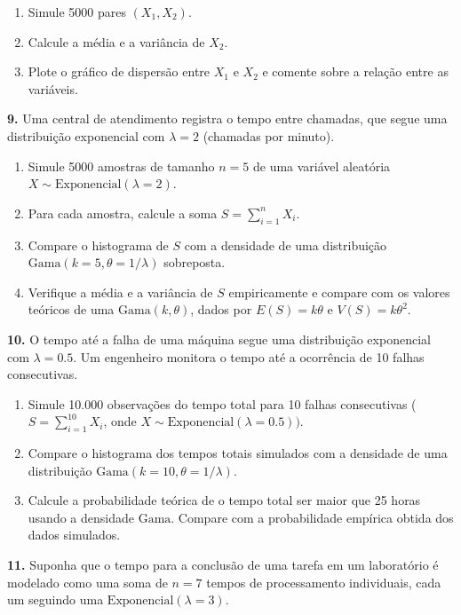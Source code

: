 \documentclass[
]{book}
\begin{document}
\begin{enumerate}
\def\labelenumi{(\alph{enumi})}
\item
  Simule 5000 pares \((X_1, X_2)\).
\item
  Calcule a média e a variância de \(X_2\).
\item
  Plote o gráfico de dispersão entre \(X_1\) e \(X_2\) e comente sobre a relação entre as variáveis.
\end{enumerate}

\textbf{9.} Uma central de atendimento registra o tempo entre chamadas, que segue uma distribuição exponencial com \(\lambda = 2\) (chamadas por minuto).

\begin{enumerate}
\def\labelenumi{(\alph{enumi})}
\item
  Simule 5000 amostras de tamanho \(n = 5\) de uma variável aleatória \(X \sim \text{Exponencial}(\lambda = 2)\).
\item
  Para cada amostra, calcule a soma \(S = \sum_{i=1}^n X_i\).
\item
  Compare o histograma de \(S\) com a densidade de uma distribuição \(\text{Gama}(k = 5, \theta = 1/\lambda)\) sobreposta.
\item
  Verifique a média e a variância de \(S\) empiricamente e compare com os valores teóricos de uma \(\text{Gama}(k, \theta)\), dados por \(E(S) = k\theta\) e \(V(S) = k\theta^2\).
\end{enumerate}

\textbf{10.} O tempo até a falha de uma máquina segue uma distribuição exponencial com \(\lambda = 0.5\). Um engenheiro monitora o tempo até a ocorrência de 10 falhas consecutivas.

\begin{enumerate}
\def\labelenumi{(\alph{enumi})}
\item
  Simule 10.000 observações do tempo total para 10 falhas consecutivas (\(S = \sum_{i=1}^{10} X_i\), onde \(X \sim \text{Exponencial}(\lambda = 0.5))\).
\item
  Compare o histograma dos tempos totais simulados com a densidade de uma distribuição \(\text{Gama}(k = 10, \theta = 1/\lambda)\).
\item
  Calcule a probabilidade teórica de o tempo total ser maior que 25 horas usando a densidade \(\text{Gama}\). Compare com a probabilidade empírica obtida dos dados simulados.
\end{enumerate}

\textbf{11.} Suponha que o tempo para a conclusão de uma tarefa em um laboratório é modelado como uma soma de \(n = 7\) tempos de processamento individuais, cada um seguindo uma \(\text{Exponencial}(\lambda = 3)\).
\end{document}
